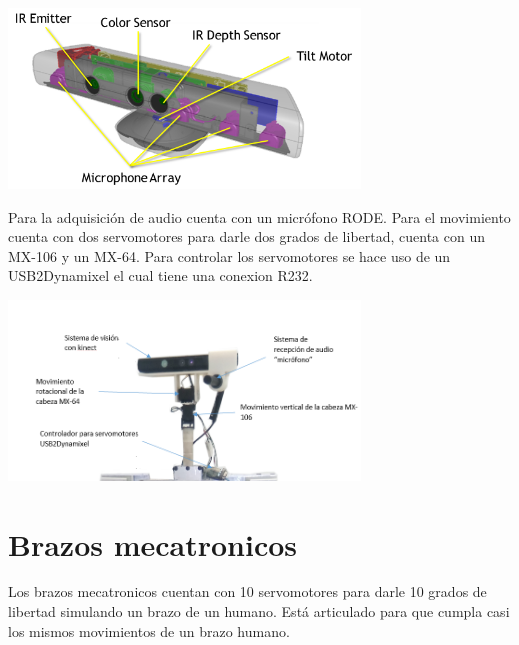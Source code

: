 \documentclass[user_manual.tex]{subfiles}
\begin{document}
\begin{center}
\includegraphics[width=0.7\textwidth]{Figures/Hardware/Partes/Kinect_sensors.png}
\label{fig:Hardware:Diagramas:Justina:Vision:Kinect}
\end{center}

Para la adquisición de audio cuenta con un micrófono RODE. Para el movimiento cuenta con dos servomotores
para darle dos grados de libertad, cuenta con un MX-106 y un MX-64. Para controlar los servomotores se hace uso de un
USB2Dynamixel el cual tiene una conexion R232.

\begin{center}
\includegraphics[width=0.7\textwidth]{Figures/Hardware/Diagramas/Cabeza.png}
\label{fig:Hardware:Diagramas:Justina:Completa}
\end{center}

\newpage
\section{Brazos mecatronicos}
Los brazos mecatronicos cuentan con 10 servomotores para darle 10 grados de libertad simulando un brazo de un humano.
Está articulado para que cumpla casi los mismos movimientos de un brazo humano.
\end{document}
